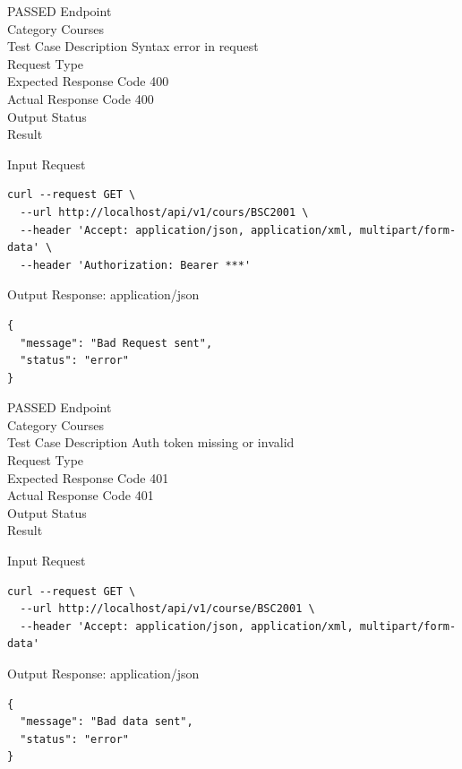 \begin{testcase}{61}{PASSED}
Endpoint \hfill {}\\
Category \hfill Courses\\
Test Case Description \hfill Syntax error in request\\

Request Type    \hfill {}\\
Expected Response Code    \hfill 400\\
Actual Response Code    \hfill 400\\

Output Status \hfill {}\\
Result \hfill {}

\begin{ipblock}{Input Request}
\begin{verbatim}
curl --request GET \
  --url http://localhost/api/v1/cours/BSC2001 \
  --header 'Accept: application/json, application/xml, multipart/form-data' \
  --header 'Authorization: Bearer ***'
\end{verbatim}
\end{ipblock}

\begin{opblock}{Output Response: application/json}
\begin{verbatim}
{
  "message": "Bad Request sent",
  "status": "error"
}
\end{verbatim}
\end{opblock}
\end{testcase}

\begin{testcase}{62}{PASSED}
Endpoint \hfill {}\\
Category \hfill Courses\\
Test Case Description \hfill Auth token missing or invalid\\

Request Type    \hfill {}\\
Expected Response Code    \hfill 401\\
Actual Response Code    \hfill 401\\

Output Status \hfill {}\\
Result \hfill \tcstatus{PASSED}

\begin{ipblock}{Input Request}
\begin{verbatim}
curl --request GET \
  --url http://localhost/api/v1/course/BSC2001 \
  --header 'Accept: application/json, application/xml, multipart/form-data'
\end{verbatim}
\end{ipblock}

\begin{opblock}{Output Response: application/json}
\begin{verbatim}
{
  "message": "Bad data sent",
  "status": "error"
}
\end{verbatim}
\end{opblock}
\end{testcase}

